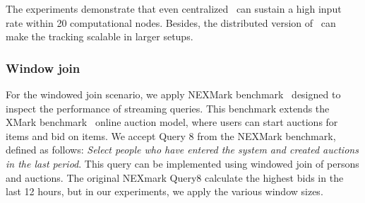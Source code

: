 The experiments demonstrate that even centralized \tracker\ can sustain a high input rate within 20 computational nodes. Besides, the distributed version of \tracker\ can make the tracking scalable in larger setups.

\subsubsection{Window join}
For the windowed join scenario, we apply NEXMark benchmark~\cite{tucker2008nexmark} designed to inspect the performance of streaming queries. This benchmark extends the XMark benchmark~\cite{schmidt2002xmark} online auction model, where users can start auctions for items and bid on items. We accept Query 8 from the NEXMark benchmark, defined as follows: {\em Select people who have entered the system and created auctions in the last period}. This query can be implemented using windowed join of persons and auctions. The original NEXmark Query8 calculate the highest bids in the last 12 hours, but in our experiments, we apply the various window sizes.


